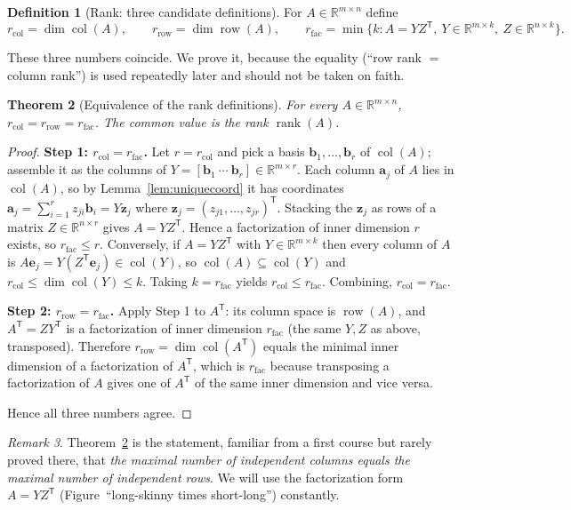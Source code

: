 \documentclass[11pt,oneside]{book}
\theoremstyle{plain}
\newtheorem{theorem}{Theorem}[chapter]
\theoremstyle{definition}
\newtheorem{definition}[theorem]{Definition}
\theoremstyle{remark}
\newtheorem{remark}[theorem]{Remark}
\newcommand{\R}{\mathbb{R}}
\newcommand{\rank}{\operatorname{rank}}
\newcommand{\col}{\operatorname{col}}
\newcommand{\row}{\operatorname{row}}
\newcommand{\dimm}{\operatorname{dim}}
\newcommand{\T}{^{\mathsf T}}
\newcommand{\bz}{\mathbf{z}}
\newcommand{\ba}{\mathbf{a}}
\newcommand{\bb}{\mathbf{b}}
\newcommand{\be}{\mathbf{e}}
\begin{document}
\begin{definition}[Rank: three candidate definitions]\label{def:rank}
For $A\in\R^{m\times n}$ define
\[
r_{\mathrm{col}}=\dimm\col(A),\qquad
r_{\mathrm{row}}=\dimm\row(A),\qquad
r_{\mathrm{fac}}=\min\{k: A=YZ\T,\ Y\in\R^{m\times k},\ Z\in\R^{n\times k}\}.
\]
\end{definition}

These three numbers coincide. We prove it, because the equality (``row rank $=$ column
rank'') is used repeatedly later and should not be taken on faith.

\begin{theorem}[Equivalence of the rank definitions]\label{thm:rankequiv}
For every $A\in\R^{m\times n}$, $r_{\mathrm{col}}=r_{\mathrm{row}}=r_{\mathrm{fac}}$.
The common value is the \emph{rank} $\rank(A)$.
\end{theorem}
\begin{proof}
\textbf{Step 1: $r_{\mathrm{col}}=r_{\mathrm{fac}}$.}
Let $r=r_{\mathrm{col}}$ and pick a basis $\bb_1,\dots,\bb_r$ of $\col(A)$; assemble it
as the columns of $Y=[\bb_1\ \cdots\ \bb_r]\in\R^{m\times r}$. Each column $\ba_j$ of
$A$ lies in $\col(A)$, so by Lemma~\ref{lem:uniquecoord} it has coordinates
$\ba_j=\sum_{i=1}^r z_{ji}\bb_i=Y\bz_j$ where $\bz_j=(z_{j1},\dots,z_{jr})\T$. Stacking
the $\bz_j$ as rows of a matrix $Z\in\R^{n\times r}$ gives $A=YZ\T$. Hence a
factorization of inner dimension $r$ exists, so $r_{\mathrm{fac}}\le r$. Conversely, if
$A=YZ\T$ with $Y\in\R^{m\times k}$ then every column of $A$ is
$A\be_j=Y(Z\T\be_j)\in\col(Y)$, so $\col(A)\subseteq\col(Y)$ and
$r_{\mathrm{col}}\le\dimm\col(Y)\le k$. Taking $k=r_{\mathrm{fac}}$ yields
$r_{\mathrm{col}}\le r_{\mathrm{fac}}$. Combining, $r_{\mathrm{col}}=r_{\mathrm{fac}}$.

\textbf{Step 2: $r_{\mathrm{row}}=r_{\mathrm{fac}}$.}
Apply Step 1 to $A\T$: its column space is $\row(A)$, and $A\T=Z Y\T$ is a
factorization of inner dimension $r_{\mathrm{fac}}$ (the same $Y,Z$ as above,
transposed). Therefore $r_{\mathrm{row}}=\dimm\col(A\T)$ equals the minimal inner
dimension of a factorization of $A\T$, which is $r_{\mathrm{fac}}$ because transposing a
factorization of $A$ gives one of $A\T$ of the same inner dimension and vice versa.

Hence all three numbers agree.
\end{proof}

\begin{remark}
Theorem~\ref{thm:rankequiv} is the statement, familiar from a first course but rarely
proved there, that \emph{the maximal number of independent columns equals the maximal
number of independent rows}. We will use the factorization form
$A=YZ\T$ (Figure~``long-skinny times short-long'') constantly.
\end{remark}
\end{document}
